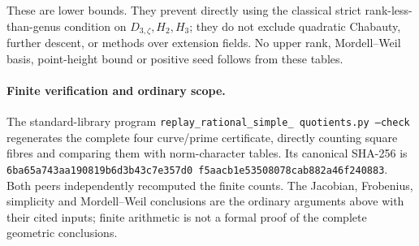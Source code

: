 These are lower bounds. They prevent directly using the classical strict
rank-less-than-genus condition on \(D_{3,\zeta},H_2,H_3\); they do not
exclude quadratic Chabauty, further descent, or methods over extension
fields. No upper rank, Mordell--Weil basis, point-height bound or positive
seed follows from these tables.

\paragraph{Finite verification and ordinary scope.}
The standard-library program
\texttt{replay\_\allowbreak rational\_\allowbreak simple\_\allowbreak
quotients.py --check} regenerates the
complete four curve/prime certificate, directly counting square fibres
and comparing them with norm-character tables. Its canonical SHA-256 is
\texttt{6ba65a743aa19081\allowbreak 9b6d3b43c7e357d0\allowbreak
f5aacb1e53508078\allowbreak cab882a46f240883}.
Both peers independently recomputed the finite counts. The Jacobian,
Frobenius, simplicity and Mordell--Weil conclusions are the ordinary
arguments above with their cited inputs; finite arithmetic is not a
formal proof of the complete geometric conclusions.
